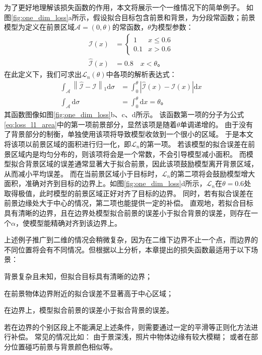 为了更好地理解该损失函数的作用，本文将展示一个一维情况下的简单例子。
如图\ref{fig:one_dim_loss}a所示，假设拟合目标包含前景和背景，为分段常函数；前景模型为定义在前景区域$\mathcal{A}=(0,\theta)$的常函数，$\theta$为模型参数：
\begin{align}
\mathcal{I}(x) &= \begin{cases}
    1   & x \leq 0.6 \\
    0.1 & x > 0.6
\end{cases}\\
\hat{\mathcal{I}}(x) &= 0.8 \quad x < \theta
\text{。}
\end{align}
在此定义下，我们可求出$\mathcal{L}_n(\theta)$中各项的解析表达式：
\begin{align}
\int_{\mathcal{A}} \left\| \hat{\mathcal{I}} - \mathcal{I} \right\|_1 \mathrm{d}\sigma
&= \int_0^{\theta} \left| \hat{\mathcal{I}}(x) - \mathcal{I}(x) \right| \mathrm{d}x \\
\int_{\mathcal{A}}\mathrm{d}\sigma &= \int_0^{\theta} \mathrm{d}x = \theta
\text{。}
\end{align}
其函数图像如图\ref{fig:one_dim_loss}b、c、d所示。
该函数第一项的分子为公式\eqref{eq:loss_l1_area}中的第一项前景部分，显然该项是随着$\theta$单调递增的。
由于没有了背景部分的制衡，单独使用该项将导致模型收敛到一个很小的区域。
于是本文将该项以前景区域的面积进行归一化，即$\mathcal{L}_n$的第一项。
若该模型的拟合误差在前景区域内是均匀分布的，则该项将会是一个常数，不会引导模型减小面积。
而模型拟合背景区域的误差通常显著大于拟合前景，因此该项鼓励模型离开背景区域，从而减小平均误差。
而在当前景区域小于目标时，$\mathcal{L}_n$的第二项将会鼓励模型增大面积，准确对齐到目标的边界上。如图\ref{fig:one_dim_loss}d所示，$\mathcal{L}_n$在$\theta=0.6$处取得极值，此时模型的前景区域正好对齐了目标的边界。
同时，若有拟合误差在前景边缘处大于中心的情况，第二项也能提供一定的补偿。
直观地，若拟合目标具有清晰的边界，且在边界处模型拟合前景的误差小于拟合背景的误差，则存在一个$\alpha$，使模型能精确对齐到该边界上。

上述例子推广到二维的情况会稍微复杂，因为在二维下边界不止一个点，而边界的不同位置将会有不同情况。但根据以上分析，本章提出的损失函数最适用于以下场景：
\begin{enumerate*}
    \item 背景复杂且未知，但拟合目标具有清晰的边界；
    \item 在前景物体边界附近的拟合误差不显著高于中心区域；
    \item 在边界上，模型拟合前景的误差小于拟合背景的误差。
\end{enumerate*}
若在边界的个别区段上不能满足上述条件，则需要通过一定的平滑等正则化方法进行补偿。
常见的情况比如：
由于景深浅，照片中物体边缘有较大模糊；
或者在部分位置碰巧前景与背景颜色相似等。

